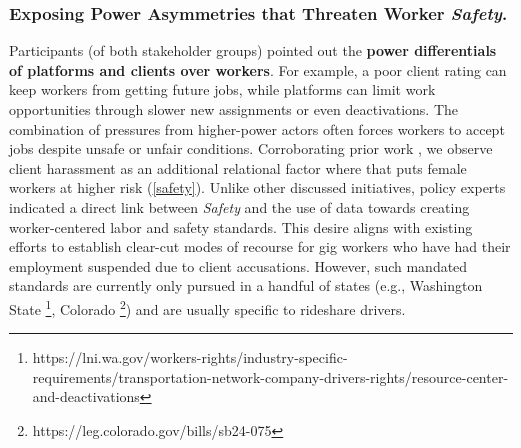 \subsubsection{\textbf{{Exposing Power Asymmetries that Threaten Worker \textit{Safety}}.}}
{Participants (of both stakeholder groups) pointed out the \textbf{power differentials of platforms and clients over workers}. For example, a poor client rating can keep workers from getting future jobs, while platforms can limit work opportunities through slower new assignments or even deactivations. The combination of pressures from higher-power actors often forces workers to accept jobs despite unsafe or unfair conditions. Corroborating prior work \cite{5qBZ, disruption, sannon2022privacy}, we observe client harassment as an additional relational factor where that puts female workers at higher risk (\ref{safety}). 
%
Unlike other discussed initiatives, policy experts indicated a direct link between \textit{Safety} and the use of data towards creating worker-centered labor and safety standards. This desire aligns with existing efforts to establish clear-cut modes of recourse for gig workers who have had their employment suspended due to client accusations. However, such mandated standards are currently only pursued in a handful of states (e.g., Washington State \footnote{https://lni.wa.gov/workers-rights/industry-specific-requirements/transportation-network-company-drivers-rights/resource-center-and-deactivations}, Colorado \footnote{https://leg.colorado.gov/bills/sb24-075}) and are usually specific to rideshare drivers. 

}
